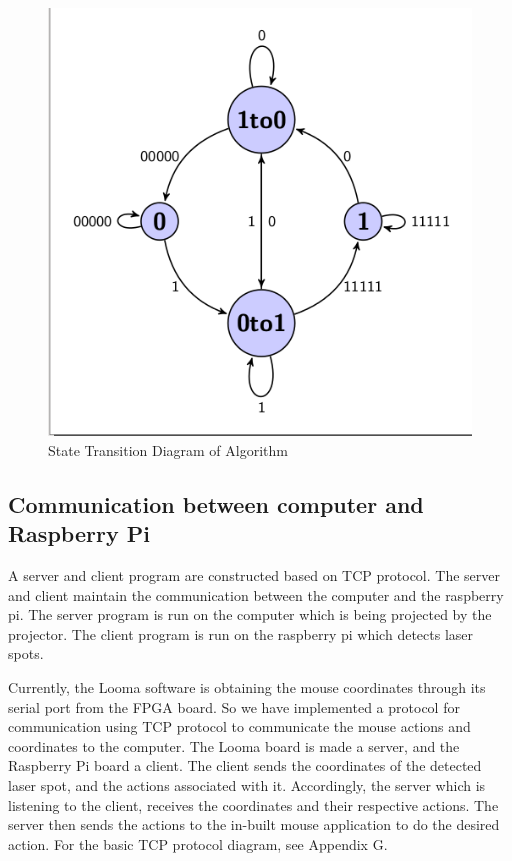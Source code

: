 \documentclass[12pt, a4paper]{article}
\begin{document}
\begin{figure}[htp]
\centering
\includegraphics[scale=0.35]{state.png}
\caption{State Transition Diagram of Algorithm}
\label{}
\end{figure}
	
\subsection{Communication between computer and Raspberry Pi}
	A server and client program are constructed based on TCP protocol. The server and client maintain the communication between the computer and the raspberry pi. The server program is run on the computer which is being projected by the projector. The client program is run on the raspberry pi which detects laser spots. 
	
	Currently, the Looma software is obtaining the mouse coordinates through its serial port from the FPGA board. So we have implemented a protocol for communication using TCP protocol to communicate the mouse actions and coordinates to the computer. The Looma board is made a server, and the Raspberry Pi board a client. The client sends the coordinates of the detected laser spot, and the actions associated with it. Accordingly, the server which is listening to the client, receives the coordinates and their respective actions. The server then sends the actions to the in-built mouse application to do the desired action.  For the basic TCP protocol diagram, see Appendix G.
	
\end{document}
